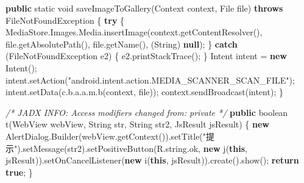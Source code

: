 \documentclass[
]{article}
\newenvironment{Shaded}{}{}
\newcommand{\BuiltInTok}[1]{\textcolor[rgb]{0.00,0.50,0.00}{#1}}
\newcommand{\CommentTok}[1]{\textcolor[rgb]{0.38,0.63,0.69}{\textit{#1}}}
\newcommand{\ControlFlowTok}[1]{\textcolor[rgb]{0.00,0.44,0.13}{\textbf{#1}}}
\newcommand{\DataTypeTok}[1]{\textcolor[rgb]{0.56,0.13,0.00}{#1}}
\newcommand{\FunctionTok}[1]{\textcolor[rgb]{0.02,0.16,0.49}{#1}}
\newcommand{\KeywordTok}[1]{\textcolor[rgb]{0.00,0.44,0.13}{\textbf{#1}}}
\newcommand{\NormalTok}[1]{#1}
\newcommand{\OperatorTok}[1]{\textcolor[rgb]{0.40,0.40,0.40}{#1}}
\newcommand{\StringTok}[1]{\textcolor[rgb]{0.25,0.44,0.63}{#1}}
\begin{document}
\begin{Shaded}
\begin{Highlighting}[]
    \KeywordTok{public} \DataTypeTok{static} \DataTypeTok{void} \FunctionTok{saveImageToGallery}\OperatorTok{(}\BuiltInTok{Context}\NormalTok{ context}\OperatorTok{,} \BuiltInTok{File}\NormalTok{ file}\OperatorTok{)} \KeywordTok{throws} \BuiltInTok{FileNotFoundException} \OperatorTok{\{}
        \ControlFlowTok{try} \OperatorTok{\{}
\NormalTok{            MediaStore}\OperatorTok{.}\FunctionTok{Images}\OperatorTok{.}\FunctionTok{Media}\OperatorTok{.}\FunctionTok{insertImage}\OperatorTok{(}\NormalTok{context}\OperatorTok{.}\FunctionTok{getContentResolver}\OperatorTok{(),}\NormalTok{ file}\OperatorTok{.}\FunctionTok{getAbsolutePath}\OperatorTok{(),}\NormalTok{ file}\OperatorTok{.}\FunctionTok{getName}\OperatorTok{(),} \OperatorTok{(}\BuiltInTok{String}\OperatorTok{)} \KeywordTok{null}\OperatorTok{);}
        \OperatorTok{\}} \ControlFlowTok{catch} \OperatorTok{(}\BuiltInTok{FileNotFoundException}\NormalTok{ e2}\OperatorTok{)} \OperatorTok{\{}
\NormalTok{            e2}\OperatorTok{.}\FunctionTok{printStackTrace}\OperatorTok{();}
        \OperatorTok{\}}
\NormalTok{        Intent intent }\OperatorTok{=} \KeywordTok{new} \FunctionTok{Intent}\OperatorTok{();}
\NormalTok{        intent}\OperatorTok{.}\FunctionTok{setAction}\OperatorTok{(}\StringTok{"android.intent.action.MEDIA\_SCANNER\_SCAN\_FILE"}\OperatorTok{);}
\NormalTok{        intent}\OperatorTok{.}\FunctionTok{setData}\OperatorTok{(}\NormalTok{c}\OperatorTok{.}\FunctionTok{b}\OperatorTok{.}\FunctionTok{a}\OperatorTok{.}\FunctionTok{a}\OperatorTok{.}\FunctionTok{m}\OperatorTok{.}\FunctionTok{b}\OperatorTok{(}\NormalTok{context}\OperatorTok{,}\NormalTok{ file}\OperatorTok{));}
\NormalTok{        context}\OperatorTok{.}\FunctionTok{sendBroadcast}\OperatorTok{(}\NormalTok{intent}\OperatorTok{);}
    \OperatorTok{\}}

    \CommentTok{/* JADX INFO: Access modifiers changed from: private */}
    \KeywordTok{public} \DataTypeTok{boolean} \FunctionTok{t}\OperatorTok{(}\NormalTok{WebView webView}\OperatorTok{,} \BuiltInTok{String}\NormalTok{ str}\OperatorTok{,} \BuiltInTok{String}\NormalTok{ str2}\OperatorTok{,}\NormalTok{ JsResult jsResult}\OperatorTok{)} \OperatorTok{\{}
        \KeywordTok{new}\NormalTok{ AlertDialog}\OperatorTok{.}\FunctionTok{Builder}\OperatorTok{(}\NormalTok{webView}\OperatorTok{.}\FunctionTok{getContext}\OperatorTok{()).}\FunctionTok{setTitle}\OperatorTok{(}\StringTok{"提示"}\OperatorTok{).}\FunctionTok{setMessage}\OperatorTok{(}\NormalTok{str2}\OperatorTok{).}\FunctionTok{setPositiveButton}\OperatorTok{(}\NormalTok{R}\OperatorTok{.}\FunctionTok{string}\OperatorTok{.}\FunctionTok{ok}\OperatorTok{,} \KeywordTok{new} \FunctionTok{j}\OperatorTok{(}\KeywordTok{this}\OperatorTok{,}\NormalTok{ jsResult}\OperatorTok{)).}\FunctionTok{setOnCancelListener}\OperatorTok{(}\KeywordTok{new} \FunctionTok{i}\OperatorTok{(}\KeywordTok{this}\OperatorTok{,}\NormalTok{ jsResult}\OperatorTok{)).}\FunctionTok{create}\OperatorTok{().}\FunctionTok{show}\OperatorTok{();}
        \ControlFlowTok{return} \KeywordTok{true}\OperatorTok{;}
    \OperatorTok{\}}


\end{Highlighting}
\end{Shaded}
\end{document}

